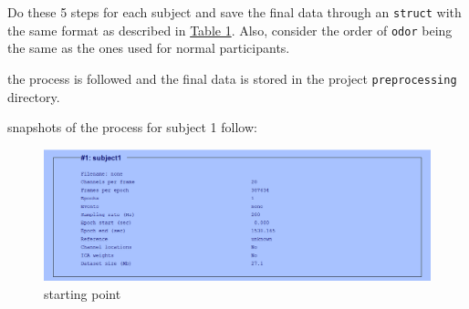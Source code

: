 \documentclass[12pt]{article}
\begin{document}
Do these 5 steps for each subject and save the final data through an \texttt{struct} with the same format as described in \hyperref[tab:table1]{Table 1}. Also, consider the order of \texttt{odor} being the same as the ones used for normal participants.

\begin{qsolve}[]
	the process is followed and the final data is stored in the project \texttt{preprocessing} directory.

	snapshots of the process for subject 1 follow:
\end{qsolve}

\vfil
\begin{figure}[h!]
	\centering
	\includegraphics*[width=\linewidth]{../computation/preprocessing/snapshots/subject1.png}
	\caption{starting point}
\end{figure}

\newpage
\end{document}
